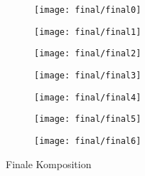 \begin{figure}[htbp]
	\centering

		    	
	\begin{subfigure}[b]{0.4\textwidth}
		\centering
		\texttt{[image: final/final0]} %
		\caption{}
	\end{subfigure}
	\begin{subfigure}[b]{0.4\textwidth}
		\centering
		\texttt{[image: final/final1]} %
		\caption{}
	\end{subfigure}
	\begin{subfigure}[b]{0.4\textwidth}
		\centering
		\texttt{[image: final/final2]} %
		\caption{}
	\end{subfigure}
	\begin{subfigure}[b]{0.4\textwidth}
		\centering
		\texttt{[image: final/final3]} %
		\caption{}
	\end{subfigure}
	\begin{subfigure}[b]{0.4\textwidth}
		\centering
		\texttt{[image: final/final4]} %
		\caption{}
	\end{subfigure}
	\begin{subfigure}[b]{0.4\textwidth}
		\centering
		\texttt{[image: final/final5]} %
		\caption{}
	\end{subfigure}
	\begin{subfigure}[b]{0.4\textwidth}
		\centering
		\texttt{[image: final/final6]} %
		\caption{}
	\end{subfigure}
			    
	\caption{Finale Komposition}
	\label{fig:final}
\end{figure}


